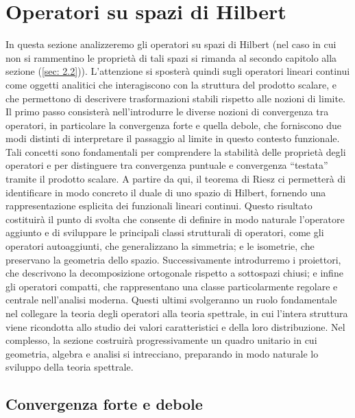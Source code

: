 \documentclass[a4paper,12pt]{report}
\begin{document}
 \newpage

\section{Operatori su spazi di Hilbert}

In questa sezione analizzeremo gli operatori su spazi di Hilbert (nel caso in cui non si rammentino le proprietà di tali spazi si rimanda al secondo capitolo alla sezione (\ref{sec: 2.2})). L’attenzione si sposterà quindi sugli operatori lineari continui come oggetti analitici che interagiscono con la struttura del prodotto scalare, e che permettono di descrivere trasformazioni stabili rispetto alle nozioni di limite.
Il primo passo consisterà nell’introdurre le diverse nozioni di convergenza tra operatori, in particolare la convergenza forte e quella debole, che forniscono due modi distinti di interpretare il passaggio al limite in questo contesto funzionale. Tali concetti sono fondamentali per comprendere la stabilità delle proprietà degli operatori e per distinguere tra convergenza puntuale e convergenza “testata” tramite il prodotto scalare. A partire da qui, il teorema di Riesz ci permetterà di identificare in modo concreto il duale di uno spazio di Hilbert, fornendo una rappresentazione esplicita dei funzionali lineari continui. Questo risultato costituirà il punto di svolta che consente di definire in modo naturale l’operatore aggiunto e di sviluppare le principali classi strutturali di operatori, come gli operatori autoaggiunti, che generalizzano la simmetria; e le isometrie, che preservano la geometria dello spazio.
Successivamente introdurremo i proiettori, che descrivono la decomposizione ortogonale rispetto a sottospazi chiusi; e infine gli operatori compatti, che rappresentano una classe particolarmente regolare e centrale nell’analisi moderna. Questi ultimi svolgeranno un ruolo fondamentale nel collegare la teoria degli operatori alla teoria spettrale, in cui l’intera struttura viene ricondotta allo studio dei valori caratteristici e della loro distribuzione. Nel complesso, la sezione costruirà progressivamente un quadro unitario in cui geometria, algebra e analisi si intrecciano, preparando in modo naturale lo sviluppo della teoria spettrale.

\subsection{Convergenza forte e debole}
\end{document}
